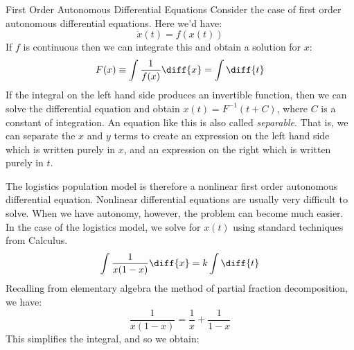                 \begin{fexample}{First Order Autonomous 
                                 Differential Equations}{}
                    Consider the case of first order autonomous
                    differential equations. Here we'd have:
                    \begin{equation}
                        \dot{x}(t)=f(x(t))
                    \end{equation}
                    If $f$ is continuous then we can integrate this
                    and obtain a solution for $x$:
                    \begin{equation}
                        F(x)\equiv\int\frac{1}{f(x)}\diff{x}
                        =\int\diff{t}
                    \end{equation}
                    If the integral on the left hand side produces
                    an invertible function, then we can solve the
                    differential equation and obtain
                    $x(t)=F^{-1}(t+C)$, where $C$ is a constant
                    of integration. An equation like this is
                    also called \textit{separable}. That is, we
                    can separate the $x$ and $y$ terms to create
                    an expression on the left hand side which is
                    written purely in $x$, and an expression on
                    the right which is written purely in $t$.
                \end{fexample}
                The logistics population model is therefore a
                nonlinear first order autonomous differential
                equation. Nonlinear differential equations are
                usually very difficult to solve. When we have
                autonomy, however, the problem can become much
                easier. In the case of the logistics model,
                we solve for $x(t)$ using standard techniques
                from Calculus.
                \begin{equation}
                    \int\frac{1}{x(1-x)}\diff{x}=k\int\diff{t}
                \end{equation}
                Recalling from elementary algebra
                the method of partial fraction decomposition,
                we have:
                \begin{equation}
                    \frac{1}{x(1-x)}=\frac{1}{x}+\frac{1}{1-x}
                \end{equation}
                This simplifies the integral, and so we obtain:
